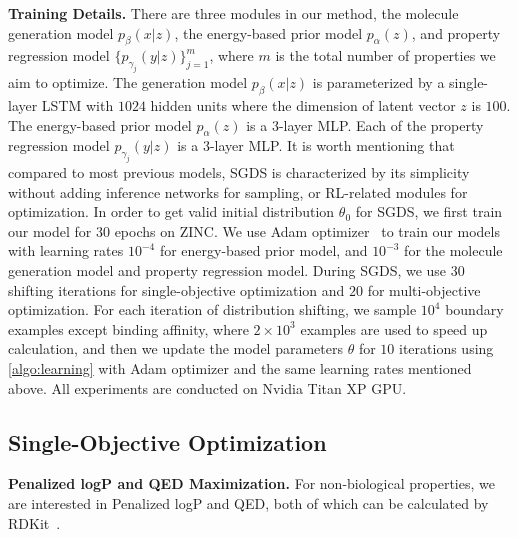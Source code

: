 \documentclass[accepted]{uai2023} %
\newcommand{\todo}[1]{\textcolor{blue}{#1}}
\begin{document}



\textbf{Training Details.} There are three modules in our method, the molecule generation model $p_\beta(x|z)$, the energy-based prior model $p_\alpha(z)$, and property regression model $\{p_{\gamma_j}(y|z)\}_{j=1}^m$, where $m$ is the total number of properties we aim to optimize. The generation model $p_\beta(x|z)$ is parameterized by a single-layer LSTM with $1024$ hidden units where the dimension of latent vector $z$ is $100$. The energy-based prior model $p_\alpha(z)$ is a $3$-layer MLP. Each of the property regression model $p_{\gamma_j}(y|z)$ is a 3-layer MLP. It is worth mentioning that compared to most previous models, SGDS is characterized by its simplicity without adding inference networks for sampling, or RL-related modules for optimization. In order to get valid initial distribution $\theta_0$ for SGDS, we first train our model for $30$ epochs on ZINC. We use Adam optimizer~\citep{kingma2015adam} to train our models with learning rates $10^{-4}$ for energy-based prior model, and $10^{-3}$ for the molecule generation model and property regression model. During SGDS, we use $30$ shifting iterations for single-objective optimization and $20$ for multi-objective optimization. For each iteration of distribution shifting, we sample $10^4$ boundary examples except binding affinity, where $2\times10^3$ examples are used to speed up calculation, and then we update the model parameters $\theta$ for $10$ iterations using \cref{algo:learning} with Adam optimizer and the same learning rates mentioned above. All experiments are conducted on Nvidia Titan XP GPU.

\subsection{Single-Objective Optimization} %
\label{sub:single_property_optimization}
\textbf{Penalized logP and QED Maximization.} For non-biological properties, we are interested in Penalized logP and QED, both of which can be calculated by RDKit~\citep{landrum2013rdkit}. 
\end{document}
